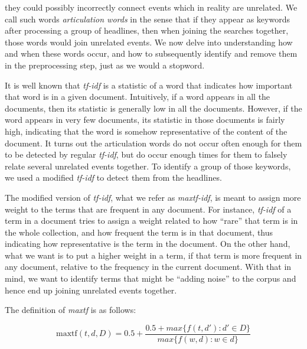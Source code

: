 \documentclass[10pt,letterpaper]{article}
\begin{document}
they could possibly incorrectly connect events which in reality are
unrelated.  We call such words
\emph{articulation words} in the sense that if they appear as keywords
after processing a group of headlines, then when joining the searches
together, those words would join unrelated events.  We now delve into
understanding how and when these words occur, and how to subsequently
identify and remove them in the preprocessing step, just as we would a
stopword.

It is well known that \emph{tf-idf} \cite{Jones72astatistical} is a statistic of a word that
indicates how important that word is in a given document.  Intuitively, if a word appears
in all the documents, then its statistic is generally low in all the documents.  However,
if the word appears in very few documents, its statistic in those documents is fairly high,
indicating that the word is somehow representative of the content of the document.
It turns out the articulation words do not occur often enough for them to be detected by
regular \emph{tf-idf}, but do occur enough
times for them to falsely relate several unrelated events together. To
identify a group of those keywords, we used a modified \emph{tf-idf}
to detect them from the headlines.

The modified version of \emph{tf-idf}, what we refer as
\emph{maxtf-idf}, is meant to assign more weight to the terms that are
frequent in any document. For instance, \emph{tf-idf} of a term in a
document tries to assign a weight related to how ``rare'' that term is
in the whole collection, and how frequent the term is in that document,
thus indicating how representative is the term in the document. On the
other hand, what we want is to put a higher weight in a term, if that term is more
frequent in any document, relative to the frequency in the current
document. With that in mind, we want to identify terms that might be
``adding noise'' to the corpus and hence end up joining unrelated
events together.

The definition of \emph{maxtf} is as follows:

\begin{equation}
  \text{maxtf}(t,d,D) = 0.5 + \frac{0.5 + max\{f(t,d') : d' \in D\}}{max\{f(w,d) : w \in d\}}
\end{equation}
\end{document}
